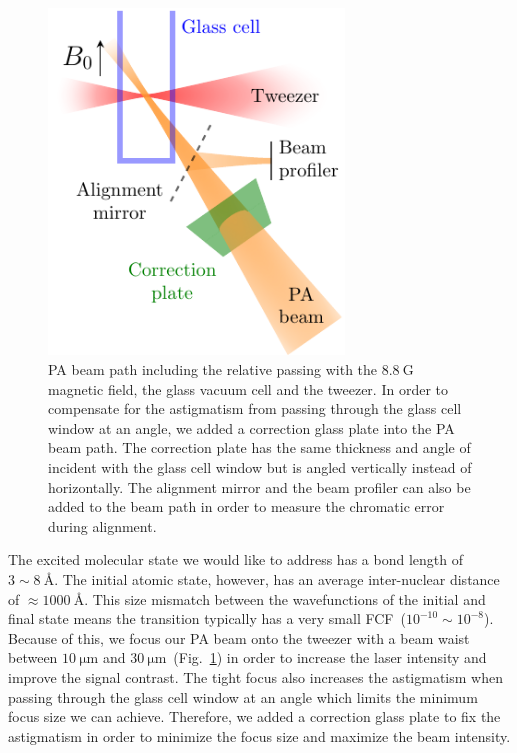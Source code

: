 \begin{figure}
  \centering
  \includegraphics[width=0.7\textwidth]{figures/pa_beampath.pdf}
  \caption[PA beam path]{
    PA beam path including the relative passing with the $8.8~\mathrm{G}$ magnetic field,
    the glass vacuum cell and the tweezer.
    In order to compensate for the astigmatism from passing through the glass cell window
    at an angle, we added a correction glass plate into the PA beam path.
    The correction plate has the same thickness and angle of incident with the glass cell window
    but is angled vertically instead of horizontally.
    The alignment mirror and the beam profiler can also be added to the beam path
    in order to measure the chromatic error during alignment.
    \label{fig:pa:beampath}}
\end{figure}

The excited molecular state we would like to address has a bond length of $3\sim8~\text{\AA}$.
The initial atomic state, however, has an average inter-nuclear distance of
$\approx\!1000~\text{\AA}$.
This size mismatch between the wavefunctions of the initial and final state
means the transition typically has a very small FCF~($10^{-10}\sim10^{-8}$).
Because of this, we focus our PA beam onto the tweezer with a beam waist between
$10~\mathrm{\mu m}$ and $30~\mathrm{\mu m}$~(Fig.~\ref{fig:pa:beampath}) in order to
increase the laser intensity and improve the signal contrast.
The tight focus also increases the astigmatism when passing through
the glass cell window at an angle which limits the minimum focus size we can achieve.
Therefore, we added a correction glass plate to fix the astigmatism
in order to minimize the focus size and maximize the beam intensity.

